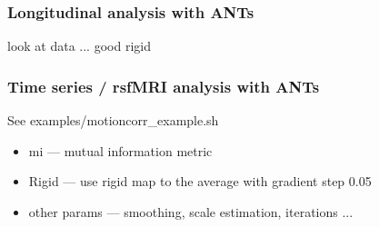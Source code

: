 \documentclass[18pt]{beamer}
\begin{document}
\begin{frame}
\frametitle{Longitudinal analysis with ANTs}
look at data ... good rigid
\end{frame} 

\begin{frame}
\frametitle{Time series / rsfMRI analysis with ANTs}
See  examples/motioncorr\_example.sh

\begin{itemize}
\item mi --- mutual information metric 
\pause
\item Rigid --- use rigid map to the average with gradient step 0.05
\pause
\item other params --- smoothing, scale estimation, iterations ... 
\end{itemize}
\end{frame}
\end{document}
